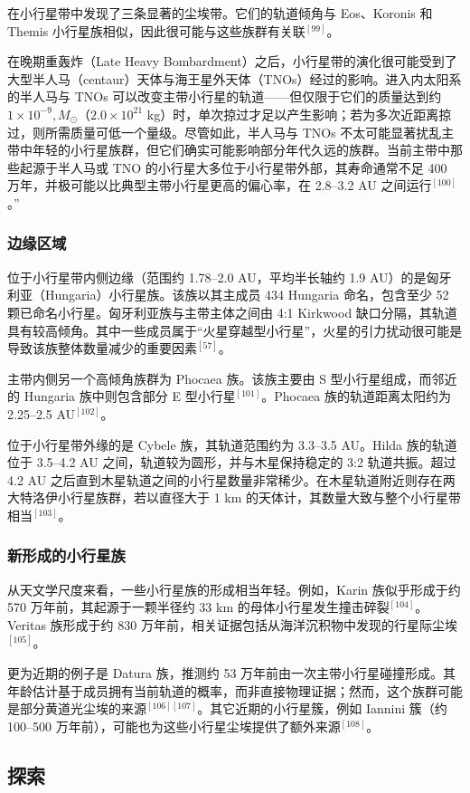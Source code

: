 在小行星带中发现了三条显著的尘埃带。它们的轨道倾角与 Eos、Koronis 和 Themis 小行星族相似，因此很可能与这些族群有关联$^{[99]}$。

在晚期重轰炸（Late Heavy Bombardment）之后，小行星带的演化很可能受到了大型半人马（centaur）天体与海王星外天体（TNOs）经过的影响。进入内太阳系的半人马与 TNOs 可以改变主带小行星的轨道——但仅限于它们的质量达到约 $1\times 10^{-9},M_{\odot}$（$2.0\times 10^{21}$ kg）时，单次掠过才足以产生影响；若为多次近距离掠过，则所需质量可低一个量级。尽管如此，半人马与 TNOs 不太可能显著扰乱主带中年轻的小行星族群，但它们确实可能影响部分年代久远的族群。当前主带中那些起源于半人马或 TNO 的小行星大多位于小行星带外部，其寿命通常不足 400 万年，并极可能以比典型主带小行星更高的偏心率，在 2.8–3.2 AU 之间运行$^{[100]}$。”
\subsubsection{边缘区域}
位于小行星带内侧边缘（范围约 1.78–2.0 AU，平均半长轴约 1.9 AU）的是匈牙利亚（Hungaria）小行星族。该族以其主成员 434 Hungaria 命名，包含至少 52 颗已命名小行星。匈牙利亚族与主带主体之间由 4:1 Kirkwood 缺口分隔，其轨道具有较高倾角。其中一些成员属于“火星穿越型小行星”，火星的引力扰动很可能是导致该族整体数量减少的重要因素$^{[57]}$。

主带内侧另一个高倾角族群为 Phocaea 族。该族主要由 S 型小行星组成，而邻近的 Hungaria 族中则包含部分 E 型小行星$^{[101]}$。Phocaea 族的轨道距离太阳约为 2.25–2.5 AU$^{[102]}$。

位于小行星带外缘的是 Cybele 族，其轨道范围约为 3.3–3.5 AU。Hilda 族的轨道位于 3.5–4.2 AU 之间，轨道较为圆形，并与木星保持稳定的 3:2 轨道共振。超过 4.2 AU 之后直到木星轨道之间的小行星数量非常稀少。在木星轨道附近则存在两大特洛伊小行星族群，若以直径大于 1 km 的天体计，其数量大致与整个小行星带相当$^{[103]}$。
\subsubsection{新形成的小行星族}
从天文学尺度来看，一些小行星族的形成相当年轻。例如，Karin 族似乎形成于约 570 万年前，其起源于一颗半径约 33 km 的母体小行星发生撞击碎裂$^{[104]}$。Veritas 族形成于约 830 万年前，相关证据包括从海洋沉积物中发现的行星际尘埃$^{[105]}$。

更为近期的例子是 Datura 族，推测约 53 万年前由一次主带小行星碰撞形成。其年龄估计基于成员拥有当前轨道的概率，而非直接物理证据；然而，这个族群可能是部分黄道光尘埃的来源$^{[106][107]}$。其它近期的小行星簇，例如 Iannini 簇（约 100–500 万年前），可能也为这些小行星尘埃提供了额外来源$^{[108]}$。
\subsection{探索}
